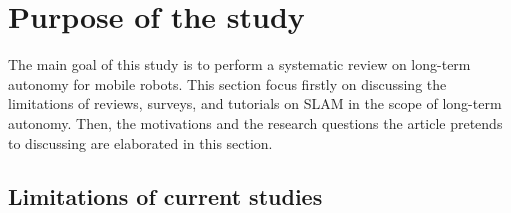 \documentclass[10pt,a4paper,notitlepage,twocolumn,oneside]{article}
\begin{document}


\section{Purpose of the study}
\label{sec:purpose}

The main goal of this study is to perform a systematic review on long-term autonomy for mobile robots. 
This section focus firstly on discussing the limitations of reviews, surveys, and tutorials on SLAM in the scope of long-term autonomy. Then, the motivations and the research questions the article pretends to discussing are elaborated in this section.

\subsection{Limitations of current studies}
\end{document}
